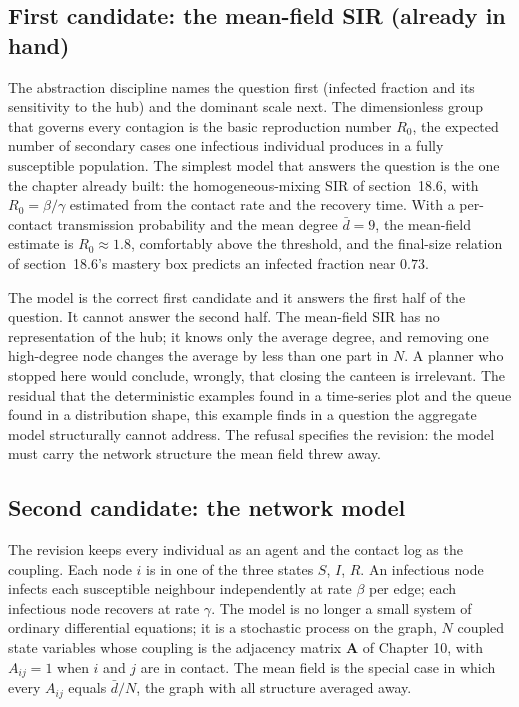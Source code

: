 \subsection{First candidate: the mean-field SIR (already in hand)}

The abstraction discipline names the question first (infected fraction and
its sensitivity to the hub) and the dominant scale next. The dimensionless
group that governs every contagion is the basic reproduction number $R_0$,
the expected number of secondary cases one infectious individual produces
in a fully susceptible population. The simplest model that answers the
question is the one the chapter already built: the homogeneous-mixing SIR
of section~18.6, with $R_0 = \beta/\gamma$ estimated from the contact rate
and the recovery time. With a per-contact transmission probability and the
mean degree $\bar{d} = 9$, the mean-field estimate is $R_0 \approx 1.8$,
comfortably above the threshold, and the final-size relation of
section~18.6's mastery box predicts an infected fraction near $0.73$.

The model is the correct first candidate and it answers the first half of
the question. It cannot answer the second half. The mean-field SIR has no
representation of the hub; it knows only the average degree, and removing
one high-degree node changes the average by less than one part in $N$. A
planner who stopped here would conclude, wrongly, that closing the canteen
is irrelevant. The residual that the deterministic examples found in a
time-series plot and the queue found in a distribution shape, this example
finds in a question the aggregate model structurally cannot address. The
refusal specifies the revision: the model must carry the network structure
the mean field threw away.

\subsection{Second candidate: the network model}

The revision keeps every individual as an agent and the contact log as the
coupling. Each node $i$ is in one of the three states $S$, $I$, $R$. An
infectious node infects each susceptible neighbour independently at rate
$\beta$ per edge; each infectious node recovers at rate $\gamma$. The model
is no longer a small system of ordinary differential equations; it is a
stochastic process on the graph, $N$ coupled state variables whose coupling
is the adjacency matrix $\mathbf{A}$ of Chapter 10, with $A_{ij} = 1$ when
$i$ and $j$ are in contact. The mean field is the special case in which
every $A_{ij}$ equals $\bar{d}/N$, the graph with all structure averaged
away.

